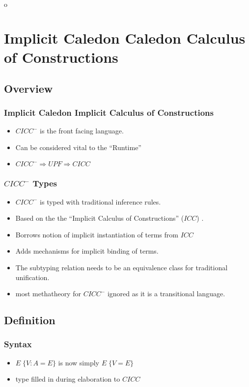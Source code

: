o\section[$CICC^-$]{Implicit Caledon Caledon Calculus of Constructions}

\subsection{Overview}

\begin{frame}
\frametitle{Implicit Caledon Implicit Calculus of Constructions}
\begin{itemize}
\item $CICC^-$ is the front facing language.
\item Can be considered vital to the ``Runtime''
\item $CICC^- \Rightarrow UPF \Rightarrow CICC$
\end{itemize}
\end{frame}


\begin{frame}
\frametitle{$CICC^-$ Types}
\begin{itemize}
\item $CICC^-$ is typed with traditional inference rules.
\item Based on the the ``Implicit Calculus of Constructions'' ($ICC$) \citep{miquel2001implicit}.
\item Borrows notion of implicit instantiation of terms from $ICC$
\item Adds mechanisms for implicit binding of terms. 
\item The subtyping relation needs to be an equivalence class for traditional unification.
\item most methatheory for $CICC^-$ ignored as it is a transitional language.
\end{itemize}
\end{frame}


\subsection{Definition}

\begin{frame}
\frametitle{Syntax}

\begin{itemize}
\item $E\; \{ V : A = E \}$ is now simply $ E \; \{ V  = E \}$
\item type filled in during elaboration to $CICC$
\end{itemize}

\end{frame}


